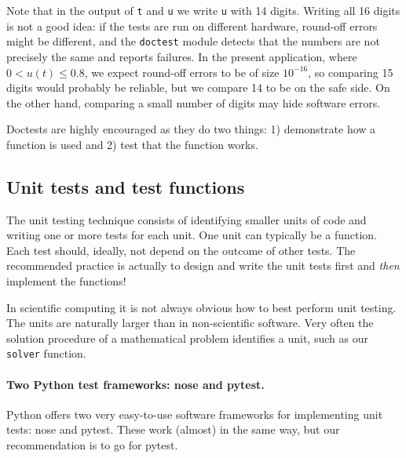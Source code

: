 \documentclass[%
oneside,                 %
final,                   %
10pt]{article}
\newenvironment{warning_mdfboxadmon}[1][]{
\begin{warning_mdfboxmdframed}[frametitle=#1]
}
{
\end{warning_mdfboxmdframed}
}
\begin{document}
\begin{warning_mdfboxadmon}
Note that in the output of \texttt{t} and \texttt{u} we write \texttt{u} with 14 digits.
Writing all 16 digits is not a good idea: if the tests are run on
different hardware, round-off errors might be different, and
the \texttt{doctest} module detects that the numbers are not precisely the same
and reports failures. In the present application, where $0 < u(t) \leq 0.8$,
we expect round-off errors to be of size $10^{-16}$, so comparing 15
digits would probably be reliable, but we compare 14 to be on the
safe side. On the other hand, comparing a small number of digits may
hide software errors.
\end{warning_mdfboxadmon}



Doctests are highly encouraged as they do two things: 1) demonstrate
how a function is used and 2) test that the function works.


\subsection{Unit tests and test functions}


The unit testing technique consists of identifying smaller units
of code and writing one or more tests for
each unit. One unit can typically be a function.
Each test should, ideally, not depend on the outcome of
other tests. The recommended practice is actually to
design and write the unit tests first and \emph{then} implement the functions!

In scientific computing it is not always obvious how to best perform
unit testing. The units are naturally larger than in non-scientific
software. Very often the solution procedure of a mathematical problem
identifies a unit, such as our \texttt{solver} function.


\paragraph{Two Python test frameworks: nose and pytest.}
Python offers two very easy-to-use software frameworks for implementing
unit tests: nose and pytest. These work (almost) in the same way,
but our recommendation is to go for pytest.
\end{document}
